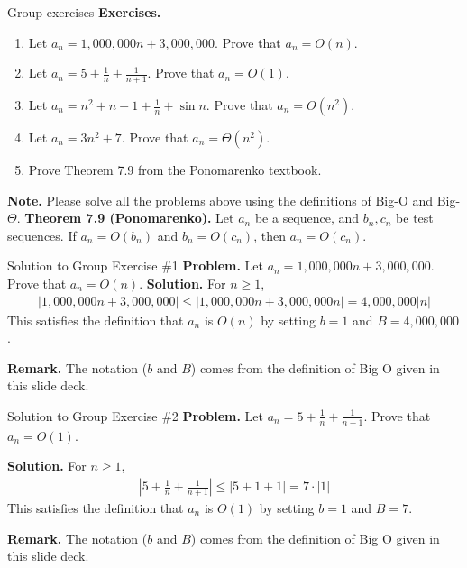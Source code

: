 \documentclass[10pt]{beamer}
\begin{document}
\begin{frame}{Group exercises}
\colorbox{green!30}{\textbf{Exercises.}}
\begin{enumerate}
	\item  Let $a_n = 1,000,000n + 3,000,000$. Prove that $a_n = O(n)$.
	\item Let $a_n = 5 + \frac{1}{n} + \frac{1}{n+1}$. Prove that $a_n = O(1)$.
	\item Let $a_n = n^2 + n + 1 + \frac{1}{n} + \sin n$. Prove that $a_n = O(n^2)$.
	\item Let $a_n = 3n^2 + 7$. Prove that $a_n = \Theta (n^2)$.
	\item Prove Theorem 7.9 from the Ponomarenko textbook. 
\end{enumerate}
\vfill
\colorbox{red!30}{\textbf{Note.}} Please solve all the problems above using the definitions of Big-O and Big-$\Theta$.
\vfill
\colorbox{blue!30}{\textbf{Theorem 7.9 (Ponomarenko).}} Let $a_n$ be a sequence, and $b_n,c_n$ be test sequences.  If $a_n = O(b_n)$ and $b_n = O(c_n)$, then $a_n = O(c_n)$.
\end{frame}


\begin{frame}{Solution to Group Exercise \#1}
\textbf{Problem.} Let $a_n = 1,000,000n + 3,000,000$. Prove that $a_n = O(n)$.
\vfill 
\textbf{Solution.}
%
For $n \geq 1$,
\begin{align*}
|1,000,000n + 3,000,000| \leq |1,000,000n + 3,000,000n| = 4,000,000 |n| 
\end{align*}
This satisfies the definition that  $a_n$ is $O(n)$ by setting $b=1$ and $B= 4,000,000$.

\vfill 
\textbf{Remark.} The notation ($b$ and $B$) comes from the definition of Big O given in this slide deck.
\end{frame}

\begin{frame}{Solution to Group Exercise \#2}
\textbf{Problem.} Let $a_n = 5 + \frac{1}{n} + \frac{1}{n+1}$. Prove that $a_n = O(1)$.

\vfill 
\textbf{Solution.}
%
For $n \geq 1$,
\begin{align*}
|5 + \frac{1}{n} + \frac{1}{n+1}| \leq |5 + 1 + 1| = 7 \cdot |1| 
\end{align*}
This satisfies the definition that  $a_n$ is $O(1)$ by setting $b=1$ and $B=7$. 

\vfill 
\textbf{Remark.} The notation ($b$ and $B$) comes from the definition of Big O given in this slide deck.

\end{frame}
\end{document}
